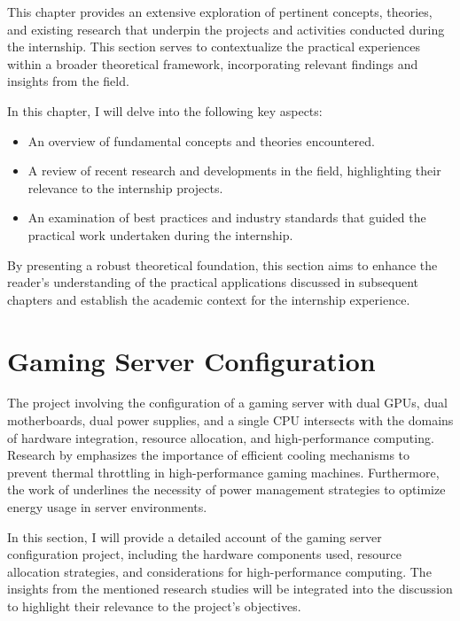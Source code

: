This chapter provides an extensive exploration of pertinent concepts, theories, and existing research that underpin the projects and activities conducted during the internship. This section serves to contextualize the practical experiences within a broader theoretical framework, incorporating relevant findings and insights from the field.

In this chapter, I will delve into the following key aspects:

\begin{itemize}
    \item An overview of fundamental concepts and theories encountered.
    \item A review of recent research and developments in the field, highlighting their relevance to the internship projects.
    \item An examination of best practices and industry standards that guided the practical work undertaken during the internship.
\end{itemize}

By presenting a robust theoretical foundation, this section aims to enhance the reader's understanding of the practical applications discussed in subsequent chapters and establish the academic context for the internship experience.

\section{Gaming Server Configuration}

The project involving the configuration of a gaming server with dual GPUs, dual motherboards, dual power supplies, and a single CPU intersects with the domains of hardware integration, resource allocation, and high-performance computing. Research by \cite{ramakrishnan2021cpu} emphasizes the importance of efficient cooling mechanisms to prevent thermal throttling in high-performance gaming machines. Furthermore, the work of \cite{bianchini2004power} underlines the necessity of power management strategies to optimize energy usage in server environments.

In this section, I will provide a detailed account of the gaming server configuration project, including the hardware components used, resource allocation strategies, and considerations for high-performance computing. The insights from the mentioned research studies will be integrated into the discussion to highlight their relevance to the project's objectives.


